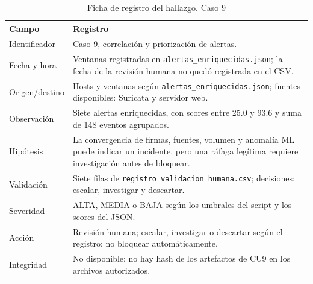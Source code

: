 \begin{table}[H]
\centering
\caption{Ficha de registro del hallazgo. Caso 9}
\label{tab:ficha-c9}
\footnotesize
\renewcommand{\arraystretch}{1.2}
\begin{tabularx}{\textwidth}{@{}>{\raggedright\arraybackslash}p{} Y@{}}
\toprule
\textbf{Campo} & \textbf{Registro} \\
\midrule
Identificador & Caso 9, correlación y priorización de alertas. \\\hline
Fecha y hora & Ventanas registradas en \texttt{alertas\_enriquecidas.json}; la fecha de la revisión humana no quedó registrada en el CSV. \\\hline
Origen/destino & Hosts y ventanas según \texttt{alertas\_enriquecidas.json}; fuentes disponibles: Suricata y servidor web. \\\hline
Observación & Siete alertas enriquecidas, con scores entre 25.0 y 93.6 y suma de 148 eventos agrupados. \\\hline
Hipótesis & La convergencia de firmas, fuentes, volumen y anomalía ML puede indicar un incidente, pero una ráfaga legítima requiere investigación antes de bloquear. \\\hline
Validación & Siete filas de \texttt{registro\_validacion\_humana.csv}; decisiones: escalar, investigar y descartar. \\\hline
Severidad & ALTA, MEDIA o BAJA según los umbrales del script y los scores del JSON. \\\hline
Acción & Revisión humana; escalar, investigar o descartar según el registro; no bloquear automáticamente. \\\hline
Integridad & No disponible: no hay hash de los artefactos de CU9 en los archivos autorizados. \\
\bottomrule
\end{tabularx}
\end{table}
